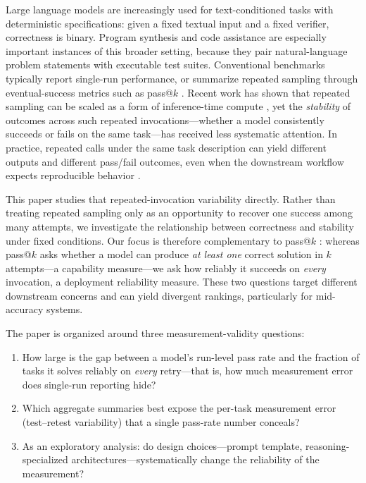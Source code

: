 \documentclass{article}
\begin{document}
Large language models are increasingly used for text-conditioned tasks with deterministic specifications: given a fixed textual input and a fixed verifier, correctness is binary. Program synthesis and code assistance are especially important instances of this broader setting, because they pair natural-language problem statements with executable test suites. Conventional benchmarks typically report single-run performance, or summarize repeated sampling through eventual-success metrics such as pass@$k$ \citep{chen2021codex,austin2021program}. Recent work has shown that repeated sampling can be scaled as a form of inference-time compute \citep{brown2024large}, yet the \emph{stability} of outcomes across such repeated invocations---whether a model consistently succeeds or fails on the same task---has received less systematic attention. In practice, repeated calls under the same task description can yield different outputs and different pass/fail outcomes, even when the downstream workflow expects reproducible behavior \citep{atil2024llm,alvarado2025repetitions}.

This paper studies that repeated-invocation variability directly. Rather than treating repeated sampling only as an opportunity to recover one success among many attempts, we investigate the relationship between correctness and stability under fixed conditions. Our focus is therefore complementary to pass@$k$ \citep{chen2021codex}: whereas pass@$k$ asks whether a model can produce \emph{at least one} correct solution in $k$ attempts---a capability measure---we ask how reliably it succeeds on \emph{every} invocation, a deployment reliability measure. These two questions target different downstream concerns and can yield divergent rankings, particularly for mid-accuracy systems.

The paper is organized around three measurement-validity questions:
\begin{enumerate}
  \item How large is the gap between a model's run-level pass rate and the fraction of tasks it solves reliably on \emph{every} retry---that is, how much measurement error does single-run reporting hide?
  \item Which aggregate summaries best expose the per-task measurement error (test--retest variability) that a single pass-rate number conceals?
  \item As an exploratory analysis: do design choices---prompt template, reasoning-specialized architectures---systematically change the reliability of the measurement?
\end{enumerate}
\end{document}
